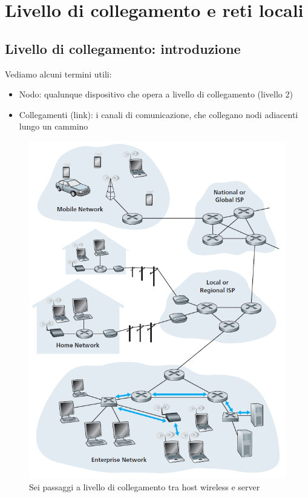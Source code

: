 \documentclass[11pt,a4paper]{article}
\begin{document}
\section{Livello di collegamento e reti locali}
\subsection{Livello di collegamento: introduzione}
Vediamo alcuni termini utili:
\begin{itemize}
	\item Nodo: qualunque dispositivo che opera a livello di collegamento (livello 2)
	\item Collegamenti (link): i canali di comunicazione, che collegano nodi adiacenti lungo un cammino
\end{itemize}
\begin{figure}
	\begin{center}
		\includegraphics[scale=1]{img/066.png}
		\caption{Sei passaggi a livello di collegamento tra host wireless e server}
		\label{fig: 066}
	\end{center}
\end{figure}
\end{document}
